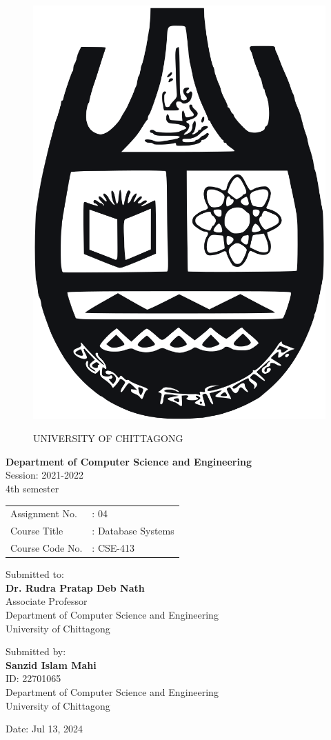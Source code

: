 
\begin{figure}[h]
		\vspace*{-1em}
		\centering
		\includegraphics[width=0.2\linewidth]{university_logo.png}
		\par
		\vspace*{2em}
		{\Large UNIVERSITY OF CHITTAGONG}
\end{figure}
\begin{center}
		\vspace*{3em}
		\textbf{Department of Computer Science and Engineering} \\
		\bigskip
		Session: 2021-2022 \\
		4th semester \\
		\bigskip
		\begin{tabular}{l l}
		  Assignment No. &: 04\\
		  Course Title &: Database Systems \\
		  Course Code No. &: CSE-413 \\
		\end{tabular}
\end{center}

\begin{center}
		\vspace*{3em}
		Submitted to: \\
		\textbf{Dr. Rudra Pratap Deb Nath} \\
		Associate Professor \\
		Department of Computer Science and Engineering \\
		University of Chittagong
\end{center}

\begin{center}
		\vspace*{3em}
		Submitted by: \\
		\textbf{Sanzid Islam Mahi} \\
		ID: 22701065 \\
		Department of Computer Science and Engineering \\
		University of Chittagong
\end{center}




\begin{center}
	\vspace*{3em}
	Date: Jul 13, 2024
\end{center}